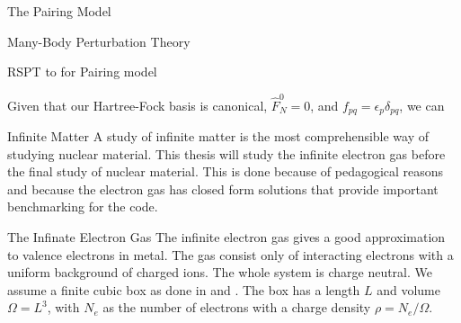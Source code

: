 \documentclass[twoside,english]{uiofysmaster}
\begin{document}
\begin{chapter}{The Pairing Model}
\begin{section}{Many-Body Perturbation Theory}
 	\begin{subsection}{RSPT to for Pairing model}
 		
 		Given that our Hartree-Fock basis is canonical, $\hat F_N^0 = 0$, and $f_{pq} = \epsilon_p \delta_{pq}$, we can
  	\end{subsection}


 \end{section}

\end{chapter}




\begin{chapter}{Infinite Matter}
	A study of infinite matter is the most comprehensible way of studying nuclear material. This thesis will study the infinite electron gas before the final study of nuclear material. This is done because of pedagogical reasons and because the electron gas has closed form solutions that provide important benchmarking for the code. 
	\begin{section}{The Infinate Electron Gas}
		The infinite electron gas gives a good approximation to valence electrons in metal. The gas consist only of interacting electrons with a uniform background of charged ions. The whole system is charge neutral. We assume a finite cubic box as done in \cite{Shepherd2012} and \cite{Shepherd2013}. The box has a length $L$ and volume $\Omega = L^3$, with $N_e$ as the number of electrons with a charge density $\rho = N_e / \Omega$.


\end{section}
\end{chapter}
\end{document}
